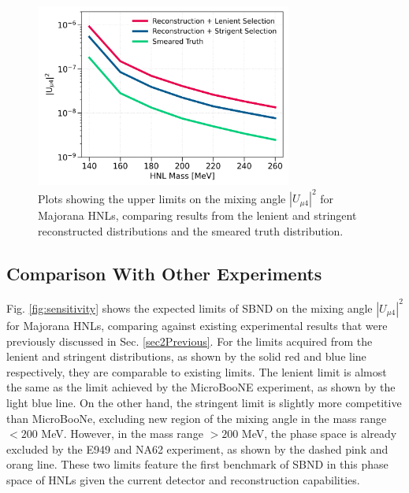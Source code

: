 \begin{figure}[htbp!]
    \centering
    \includegraphics[width=0.75\textwidth]{sensitivity_strict_loose_truth}
    \caption{Plots showing the upper limits on the mixing angle $|U_{\mu4}|^2$ for Majorana HNLs, comparing results from the lenient and stringent reconstructed distributions and the smeared truth distribution.}
    \label{fig:nupi0_reco_truth}
\end{figure}

\subsection{Comparison With Other Experiments}

Fig. \ref{fig:sensitivity} shows the expected limits of SBND on the mixing angle $|U_{\mu4}|^2$ for Majorana HNLs, comparing against existing experimental results that were previously discussed in Sec. \ref{sec2Previous}.
For the limits acquired from the lenient and stringent distributions, as shown by the solid red and blue line respectively, they are comparable to existing limits.
The lenient limit is almost the same as the limit achieved by the MicroBooNE experiment, as shown by the light blue line.
On the other hand, the stringent limit is slightly more competitive than MicroBooNe, excluding new region of the mixing angle in the mass range $< 200$ MeV.
However, in the mass range $> 200$ MeV, the phase space is already excluded by the E949 and NA62 experiment, as shown by the dashed pink and orang line.
These two limits feature the first benchmark of SBND in this phase space of HNLs given the current detector and reconstruction capabilities.

